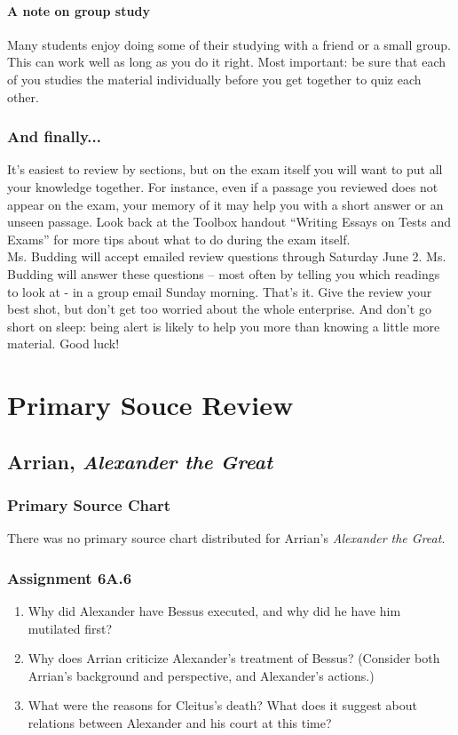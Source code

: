 \documentclass{article}
\begin{document}
    \paragraph{A note on group study}
    Many students enjoy doing some of their studying with a friend or a small group. This
    can work well as long as you do it right. Most important: be sure that each of you
    studies the material individually before you get together to quiz each other.
  \subsubsection{And finally...}
  It’s easiest to review by sections, but on the exam itself you will want to put all your
  knowledge together.  For instance, even if a passage you reviewed does not appear on
  the exam, your memory of it may help you with a short answer or an unseen passage.
  Look back at the Toolbox handout “Writing Essays on Tests and Exams” for more tips
  about what to do during the exam itself.  \\
  Ms. Budding will accept emailed review questions through Saturday June 2. Ms. Budding
  will answer these questions – most often by telling you which readings to look at - in a
  group email Sunday morning.  That’s it. Give the review your best shot, but don’t get too
  worried about the whole enterprise.   And don’t go short on sleep: being alert is likely to
  help you more than knowing a little more material.  Good luck!
\section{Primary Souce Review}
\subsection*{Arrian, \textit{Alexander the Great}}
\subsubsection*{Primary Source Chart}
There was no primary source chart distributed for Arrian's \textit{Alexander the Great}.
\subsubsection*{Assignment 6A.6}
\begin{enumerate}
  \item Why did Alexander have Bessus executed, and why did he have him mutilated first?
  \item Why does Arrian criticize Alexander’s treatment of Bessus? (Consider both Arrian’s background and perspective, and Alexander’s actions.)
  \item What were the reasons for Cleitus’s death? What does it suggest about relations between Alexander and his court at this time?
\end{enumerate}
\end{document}
